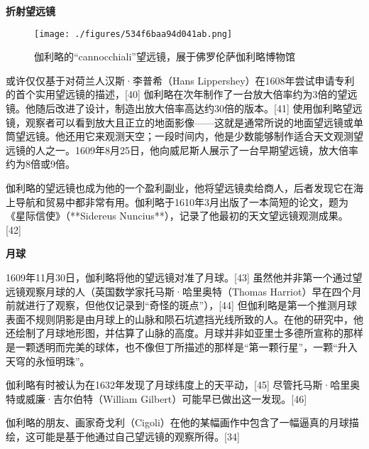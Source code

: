 \textbf{折射望远镜}
\begin{figure}[ht]
\centering
\texttt{[image: ./figures/534f6baa94d041ab.png]}
\caption{伽利略的“cannocchiali”望远镜，展于佛罗伦萨伽利略博物馆} \label{fig_JLL_3}
\end{figure}
或许仅仅基于对荷兰人汉斯·李普希（Hans Lippershey）在1608年尝试申请专利的首个实用望远镜的描述，[40] 伽利略在次年制作了一台放大倍率约为3倍的望远镜。他随后改进了设计，制造出放大倍率高达约30倍的版本。[41] 使用伽利略望远镜，观察者可以看到放大且正立的地面影像——这就是通常所说的地面望远镜或单筒望远镜。他还用它来观测天空；一段时间内，他是少数能够制作适合天文观测望远镜的人之一。1609年8月25日，他向威尼斯人展示了一台早期望远镜，放大倍率约为8倍或9倍。  

伽利略的望远镜也成为他的一个盈利副业，他将望远镜卖给商人，后者发现它在海上导航和贸易中都非常有用。伽利略于1610年3月出版了一本简短的论文，题为《星际信使》（**Sidereus Nuncius**），记录了他最初的天文望远镜观测成果。[42]

\textbf{月球}

1609年11月30日，伽利略将他的望远镜对准了月球。[43] 虽然他并非第一个通过望远镜观察月球的人（英国数学家托马斯·哈里奥特（Thomas Harriot）早在四个月前就进行了观察，但他仅记录到“奇怪的斑点”），[44] 但伽利略是第一个推测月球表面不规则阴影是由月球上的山脉和陨石坑遮挡光线所致的人。在他的研究中，他还绘制了月球地形图，并估算了山脉的高度。月球并非如亚里士多德所宣称的那样是一颗透明而完美的球体，也不像但丁所描述的那样是“第一颗行星”，一颗“升入天穹的永恒明珠”。  

伽利略有时被认为在1632年发现了月球纬度上的天平动，[45] 尽管托马斯·哈里奥特或威廉·吉尔伯特（William Gilbert）可能早已做出这一发现。[46]  

伽利略的朋友、画家奇戈利（Cigoli）在他的某幅画作中包含了一幅逼真的月球描绘，这可能是基于他通过自己望远镜的观察所得。[34]
